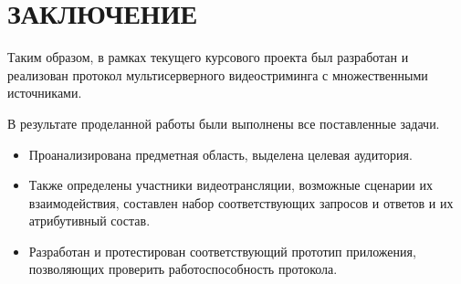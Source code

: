 \section*{ЗАКЛЮЧЕНИЕ}
Таким образом, в рамках текущего курсового проекта был разработан и реализован протокол мультисерверного видеостриминга с множественными источниками. 

В результате проделанной работы были выполнены все поставленные задачи. 
\begin{itemize}
	\item Проанализирована предметная область, выделена целевая аудитория.
	
	\item Также определены участники видеотрансляции, возможные сценарии их взаимодействия, составлен набор соответствующих запросов и ответов и их атрибутивный состав.
	
	\item Разработан и протестирован соответствующий прототип приложения, позволяющих проверить работоспособность протокола.
\end{itemize}
